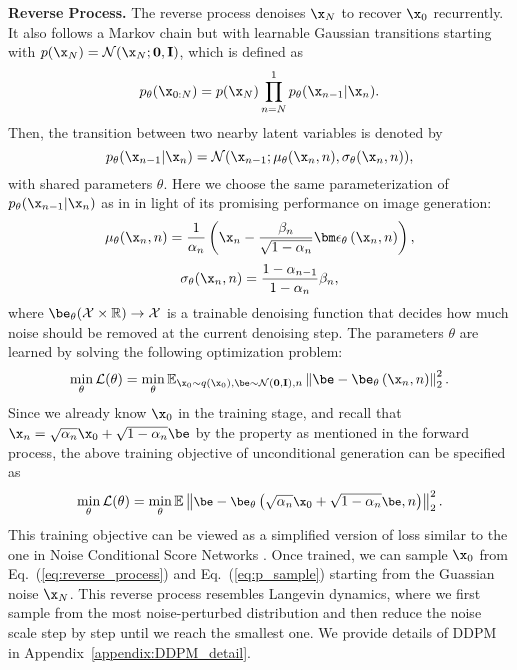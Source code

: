 {\par \textbf{Reverse Process.} The reverse process denoises $\x_N$ to recover $\x_0$ recurrently. It also follows a Markov chain but with learnable Gaussian transitions starting with $p(\x_N)={\mathcal{N}(\x_N; \mathbf{0}, \mathbf{I}) }$, which is defined as 
\begin{equation}
    p_{\theta}(\x_{0:N}) = p(\x_N) \prod_{n=N}^{1}p_\theta(\x_{n-1}|\x_n). 
    \label{eq:reverse_process}
\end{equation}
Then, the transition between two nearby latent variables is denoted by 
\begin{equation}
    p_\theta(\x_{n-1}|\x_n)  = \mathcal{N}(\x_{n-1}; {\mu_\theta(\x_n, n), \sigma_\theta(\x_n, n)}), 
    \label{eq:p_sample}
\end{equation}
with shared parameters $\theta$.  Here we choose the same parameterization of $p_\theta(\x_{n-1}|\x_n)$  as in \cite{ho2020denoising} in light of its promising performance on image generation:
\begin{equation}
    {\mu}_\theta (\x_n, n)=\frac{1}{\alpha_n}\left(\x_n-\frac{\beta_n}{\sqrt{1-\alpha_n}} {\bm \epsilon}_\theta\left(\x_n, n\right)\right),
\end{equation}
\begin{equation}
    \sigma_\theta(\x_n, n)= \frac{1 - \alpha_{n-1}}{1 - \alpha_n} \beta_n,
\end{equation}
where ${\be}_\theta({\mathcal X} \times {\mathbb R}) \rightarrow {\mathcal X}$ is a trainable denoising function that decides how much noise should be removed at the current denoising step. The parameters $\theta$ are learned by solving the following optimization problem:
\begin{equation}
\mathop{\min} _\theta \mathcal{L}(\theta)=
\min _\theta \mathbb{E}_{\x_0 \sim q\left(\x_0\right), \be \sim \mathcal{N}(\mathbf{0}, \mathbf{I}), n}\left\|\be-\be_\theta\left(\x_n, n\right)\right\|_2^2.
\label{eq:loss}
\nonumber
\end{equation}
Since we already know $\x_{0}$ in the training stage, and recall that  $\x_n = \sqrt{\alpha_n} \x_0 + \sqrt{1 - \alpha_n} {\be}$ by the property as mentioned in the forward process, the above training objective of unconditional generation can be specified as 
\begin{equation} 
\small
\mathop{\min} _\theta \mathcal{L}(\theta)=
\min _\theta \mathbb{E}\left\|\be-\be_\theta\left({\sqrt{\alpha_n} \x_0 + \sqrt{1 - \alpha_n} {\be}}, n\right)\right\|_2^2.
\label{eq:loss_x0}
\end{equation}
This training objective can be viewed as a simplified version of loss similar to the one in Noise Conditional Score Networks \cite{song2019generative, song2020improved}. Once trained, we can sample $\x_0$ from Eq.~(\ref{eq:reverse_process}) and Eq.~(\ref{eq:p_sample}) starting from the Guassian noise $\x_N$. This reverse process resembles Langevin dynamics, where we first sample from the most noise-perturbed distribution and then reduce the noise scale step by step until we reach the smallest one. We provide details of DDPM in Appendix~\ref{appendix:DDPM_detail}.

}
